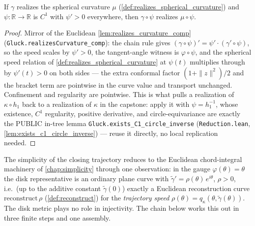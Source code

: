 \begin{lemma}
  \label{lem:realizes_spherical_comp}
  If $\gamma$ realizes the spherical curvature $\mu$
  (\cref{def:realizes_spherical_curvature}) and $\psi:\mathbb R\to\mathbb R$ is $C^1$
  with $\psi'>0$ everywhere, then $\gamma\circ\psi$ realizes $\mu\circ\psi$.
\end{lemma}

\begin{proof}

\leanok
  Mirror of the Euclidean \cref{lem:realizes_curvature_comp}
  (\texttt{Gluck.realizesCurvature\_comp}): the chain rule gives
  $(\gamma\circ\psi)'=\psi'\cdot(\gamma'\circ\psi)$, so the speed scales by $\psi'>0$, the
  tangent-angle witness is $\varphi\circ\psi$, and the spherical speed relation of
  \cref{def:realizes_spherical_curvature} at $\psi(t)$ multiplies through by
  $\psi'(t)>0$ on both sides — the extra conformal factor $(1+\|z\|^2)/2$ and the
  bracket term are pointwise in the curve value and transport unchanged. Confinement and
  regularity are pointwise. This is what pulls a realization of $\kappa\circ h_1$ back
  to a realization of $\kappa$ in the capstone: apply it with $\psi=h_1^{-1}$, whose
  existence, $C^1$ regularity, positive derivative, and circle-equivariance are exactly
  the PUBLIC in-tree lemma \texttt{Gluck.exists\_C1\_circle\_inverse}
  (\texttt{Reduction.lean}, \cref{lem:exists_c1_circle_inverse}) — reuse it directly,
  no local replication needed.
\end{proof}

The simplicity of the closing trajectory reduces to the Euclidean chord-integral
machinery of \cref{chap:simplicity} through one observation: in the gauge
$\varphi(\theta)=\theta$ the disk representative is an ordinary plane curve with
$\tilde\gamma'=\rho(\theta)\,e^{i\theta}$, $\rho>0$, i.e.\ (up to the additive constant
$\tilde\gamma(0)$) exactly a Euclidean reconstruction curve
$\mathrm{reconstruct}\,\rho$ (\cref{def:reconstruct}) for the \emph{trajectory speed}
$\rho(\theta)=q_\kappa(\theta,\tilde\gamma(\theta))$. The disk metric plays no role in
injectivity. The chain below works this out in three finite steps and one assembly.

